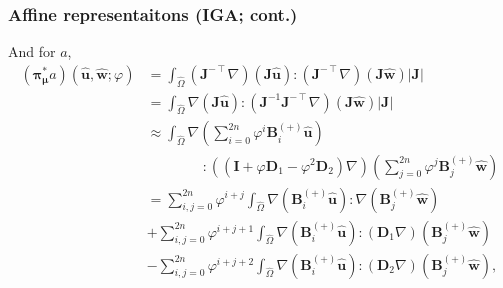 \documentclass{beamer}
\begin{document}
\begin{frame}
  \frametitle{Affine representaitons (IGA; cont.)}

  And for $a$,
  \begin{align*}
    \textstyle
    ({\bm\pi}^*_{\bm\mu}a)(
    \hat{\bm u},
    \hat{\bm w};
    \varphi
    ) &\textstyle = \int_{\hat{\Omega}}
        (\bm J^{-\intercal} \nabla) (\bm J \hat{\bm u}) :
        (\bm J^{-\intercal} \nabla) (\bm J \hat{\bm w}) |\bm J| \\
        &\textstyle = \int_{\hat{\Omega}}
        \nabla (\bm J \hat{\bm u}) :
        (\bm J^{-1} \bm J^{-\intercal} \nabla) (\bm J \hat{\bm w}) |\bm J| \\
      &\textstyle \approx \int_{\hat{\Omega}}
        \nabla \left( \sum_{i=0}^{2n} \varphi^i \bm B^{(+)}_i \hat{\bm u} \right) \\
        & \qquad \qquad \textstyle : ((\bm I + \varphi \bm D_1 - \varphi^2 \bm D_2) \nabla)
        \left( \sum_{j=0}^{2n} \varphi^j \bm B^{(+)}_j \hat{\bm w} \right) \\
      &\textstyle = \sum_{i,j=0}^{2n} \varphi^{i+j} \int_{\hat{\Omega}}
        \nabla (\bm B^{(+)}_i \hat{\bm u}) : \nabla (\bm B^{(+)}_j \hat{\bm w}) \\
      &\textstyle + \sum_{i,j=0}^{2n} \varphi^{i+j+1} \int_{\hat{\Omega}}
        \nabla (\bm B^{(+)}_i \hat{\bm u}) : (\bm D_1 \nabla) (\bm B^{(+)}_j \hat{\bm w}) \\
      &\textstyle - \sum_{i,j=0}^{2n} \varphi^{i+j+2} \int_{\hat{\Omega}}
        \nabla (\bm B^{(+)}_i \hat{\bm u}) : (\bm D_2 \nabla) (\bm B^{(+)}_j \hat{\bm w}),
  \end{align*}
\end{frame}
\end{document}
